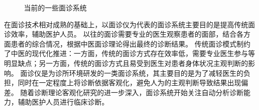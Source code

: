 \begin{figure}[h]
    \centering
    \caption{当前的一些面诊系统}
    \label{fig:med}
\end{figure}

在面诊技术相对成熟的基础上，以面诊仪为代表的面诊系统主要目的是提高传统面诊效率，辅助医护人员\cite{邸丹2016手持式舌象仪的研制, 李丹溪2017舌诊仪的发展及其在舌诊客观化研究中的应用现状}。
以往的面诊需要专业的医生观察患者的面部，结合各方面患者的综合情况，根据中医面诊理论得出最终的诊断结果。
传统面诊模式制约了中医的现代化推进：一方面，传统的面诊方式存在效率低，需要专业医生参与等明显缺点；另一方面，传统的面诊方式且易受到医生对患者身体状况主观判断的影响。
面诊仪是为诊所环境研发的一类面诊系统，其主要目的是为了减轻医生的负担，同时在一定程度上将诊断依据客观化，避免人为的主观判断导致结果出现偏差\cite{李丹溪2017舌诊仪的发展及其在舌诊客观化研究中的应用现状}。
随着诊断理论客观化研究的进一步深入，面诊系统开始关注自动分析诊断能力，辅助医护人员进行临床诊断。


